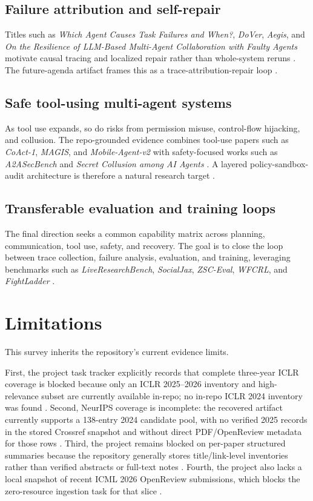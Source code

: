 \documentclass[11pt]{article}
\begin{document}
\subsection{Failure attribution and self-repair}
Titles such as \emph{Which Agent Causes Task Failures and When?}, \emph{DoVer}, \emph{Aegis}, and \emph{On the Resilience of LLM-Based Multi-Agent Collaboration with Faulty Agents} motivate causal tracing and localized repair rather than whole-system reruns \cite{icml_list,iclr_subset}. The future-agenda artifact frames this as a trace-attribution-repair loop \cite{future_directions}.

\subsection{Safe tool-using multi-agent systems}
As tool use expands, so do risks from permission misuse, control-flow hijacking, and collusion. The repo-grounded evidence combines tool-use papers such as \emph{CoAct-1}, \emph{MAGIS}, and \emph{Mobile-Agent-v2} with safety-focused works such as \emph{A2ASecBench} and \emph{Secret Collusion among AI Agents} \cite{iclr_subset,neurips_list}. A layered policy-sandbox-audit architecture is therefore a natural research target \cite{future_directions}.

\subsection{Transferable evaluation and training loops}
The final direction seeks a common capability matrix across planning, communication, tool use, safety, and recovery. The goal is to close the loop between trace collection, failure analysis, evaluation, and training, leveraging benchmarks such as \emph{LiveResearchBench}, \emph{SocialJax}, \emph{ZSC-Eval}, \emph{WFCRL}, and \emph{FightLadder} \cite{iclr_subset,neurips_list,icml_list}.

\section{Limitations}
This survey inherits the repository's current evidence limits.

First, the project task tracker explicitly records that complete three-year ICLR coverage is blocked because only an ICLR 2025--2026 inventory and high-relevance subset are currently available in-repo; no in-repo ICLR 2024 inventory was found \cite{project_tasks}. Second, NeurIPS coverage is incomplete: the recovered artifact currently supports a 138-entry 2024 candidate pool, with no verified 2025 records in the stored Crossref snapshot and without direct PDF/OpenReview metadata for those rows \cite{neurips_gap,manifest}. Third, the project remains blocked on per-paper structured summaries because the repository generally stores title/link-level inventories rather than verified abstracts or full-text notes \cite{project_tasks,project_readme}. Fourth, the project also lacks a local snapshot of recent ICML 2026 OpenReview submissions, which blocks the zero-resource ingestion task for that slice \cite{project_tasks}.
\end{document}
